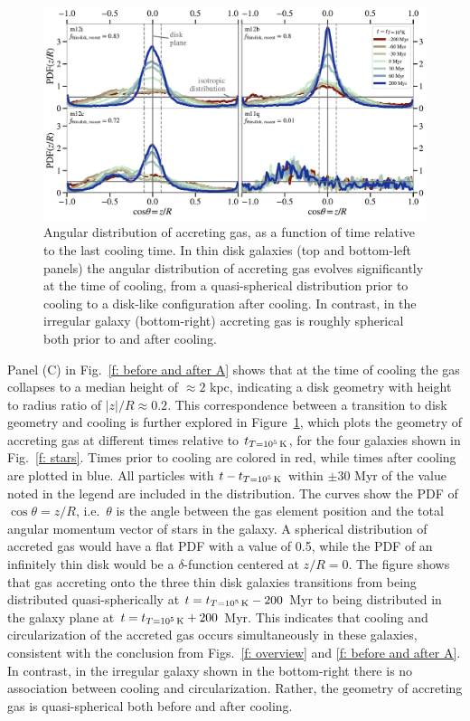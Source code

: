 \documentclass[fleqn,usenatbib]{mnras}
\newcommand{\tcon}{t_{T=10^5\,{\rm K}}}
\begin{document}
\begin{figure}
    \centering
    \includegraphics[width=\textwidth]{figures/theta_vs_t.pdf}
    \caption{
    Angular distribution of accreting gas, as a function of time relative to the last cooling time. In thin disk galaxies (top and bottom-left panels) the angular distribution of accreting gas evolves significantly at the time of cooling, from a quasi-spherical distribution prior to cooling to a disk-like configuration after cooling. 
    In contrast, in the irregular galaxy (bottom-right) accreting gas is roughly spherical both prior to and after cooling.
    }
    \label{f: theta vs t}
\end{figure}

Panel (C) in Fig.~\ref{f: before and after A} shows that at the time of cooling the gas collapses to a median height of $\approx 2$ kpc, indicating a disk geometry with height to radius ratio of $\vert z\vert/R\approx0.2$. This correspondence between a transition to disk geometry and cooling is further explored in Figure~\ref{f: theta vs t}, which plots the geometry of accreting gas at different times relative to $\tcon$, for the four galaxies shown in Fig.~\ref{f: stars}. 
Times prior to cooling are colored in red, while times after cooling are plotted in blue. All particles with $t-\tcon$ within $\pm$30 Myr of the value noted in the legend are included in the distribution. 
The curves show the PDF of $\cos \theta = z/R$, i.e.\ $\theta$ is the angle between the gas element position and the total angular momentum vector of stars in the galaxy.
A spherical distribution of accreted gas would have a flat PDF with a value of 0.5, while 
the PDF of an infinitely thin disk would be a $\delta$-function centered at $z/R = 0$.
The figure shows that gas accreting onto the three thin disk galaxies transitions from being distributed quasi-spherically at $t = \tcon-200$ Myr to being distributed in the galaxy plane at $t = \tcon+200$ Myr.
This indicates that cooling and circularization of the accreted gas occurs simultaneously in these galaxies, consistent with the conclusion from Figs.~\ref{f: overview} and \ref{f: before and after A}. In contrast, in the irregular galaxy shown in the bottom-right there is no association between cooling and circularization. Rather, the geometry of accreting gas is quasi-spherical both before and after cooling. 
\end{document}
